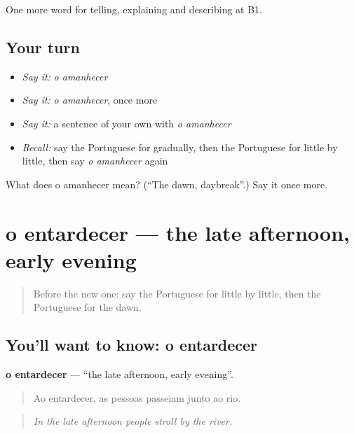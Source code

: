 \begin{grammarlens}[title={What you've built}]
One more word for telling, explaining and describing at B1.
\end{grammarlens}

\subsection*{Your turn}
\begin{itemize}
\raggedright
  \item \emph{Say it:} \emph{o amanhecer}
  \item \emph{Say it:} \emph{o amanhecer}, once more
  \item \emph{Say it:} a sentence of your own with \emph{o amanhecer}
  \item \emph{Recall:} say the Portuguese for gradually, then the Portuguese for little by little, then say \emph{o amanhecer} again
\end{itemize}

\begin{tcolorbox}[breakable,colback=teal!4,colframe=teal!35!black,title={Before you move on}]
What does o amanhecer mean? (\textquotedblleft{}The dawn, daybreak\textquotedblright{}.) Say it once more.
\end{tcolorbox}
\section[o entardecer]{o entardecer — the late afternoon, early evening}

\label{lesson:PT-C275-entardecer}



\begin{quote}
Before the new one: say the Portuguese for little by little, then the Portuguese for the dawn.
\end{quote}

\subsection*{You'll want to know: o entardecer}
\textbf{o entardecer} — \textquotedblleft{}the late afternoon, early evening\textquotedblright{}.

\begin{quote}
Ao entardecer, as pessoas passeiam junto ao rio.
\end{quote}

\begin{quote}
\emph{In the late afternoon people stroll by the river.}
\end{quote}

